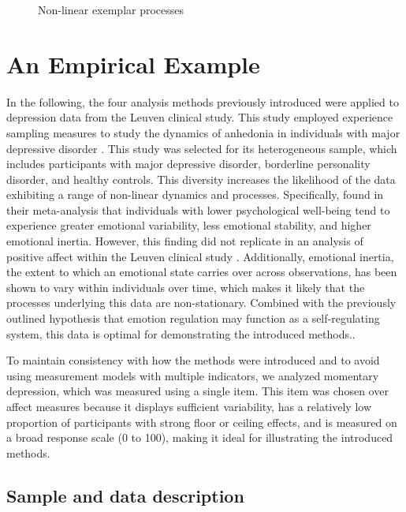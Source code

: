 \documentclass[man, floatsintext]{apa7}
\begin{document}
\begin{figure}[!ht]
  \caption{Non-linear exemplar processes}
  \label{fig:results}
\end{figure}

\section{An Empirical Example}

In the following, the four analysis methods previously introduced were
applied to depression data from the Leuven clinical study. This study employed
experience sampling measures to study the dynamics of anhedonia in
individuals with major depressive disorder \parencite{heininga_dynamical_2019}.
This study was selected for its
heterogeneous sample, which includes participants with major depressive
disorder, borderline personality disorder, and healthy controls. This diversity
increases the likelihood of the data exhibiting a range of non-linear dynamics
and processes. Specifically, \textcite{houben_relation_2015}
found in their meta-analysis
that individuals with lower psychological well-being tend to experience greater
emotional variability, less emotional stability, and higher emotional inertia.
However, this finding did not replicate in an analysis of positive affect
within the Leuven clinical study \parencite{heininga_dynamical_2019}.
Additionally, emotional
inertia, the extent to which an emotional state carries over across
observations, has been shown to vary within individuals over time, which makes
it likely that the processes underlying this data are non-stationary.
Combined with the previously outlined hypothesis
that emotion regulation may function as a self-regulating system, this data
is optimal for demonstrating the introduced methods..

To maintain consistency with how the methods were introduced and to avoid using
measurement models with multiple indicators, we analyzed momentary
depression, which was measured using a single item. This item was chosen over
affect measures because it displays sufficient variability, has a relatively
low proportion of participants with strong floor or ceiling effects, and is
measured on a broad response scale (0 to 100), making it ideal for illustrating
the introduced methods.

\subsection{Sample and data description}
\end{document}
